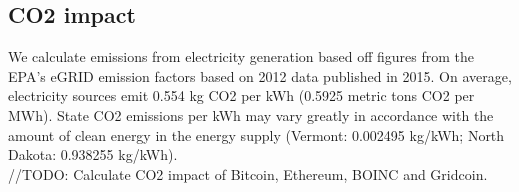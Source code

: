 \subsection{CO2 impact}

We calculate emissions from electricity generation based off figures from the EPA’s eGRID emission factors based on 2012 data published in 2015.  On average, electricity sources emit 0.554 kg CO2 per kWh (0.5925 metric tons CO2 per MWh). State CO2 emissions per kWh may vary greatly in accordance with the amount of clean energy in the energy supply (Vermont: 0.002495 kg/kWh; North Dakota: 0.938255 kg/kWh).\\ [30]

//TODO: Calculate CO2 impact of Bitcoin, Ethereum, BOINC and Gridcoin.

 